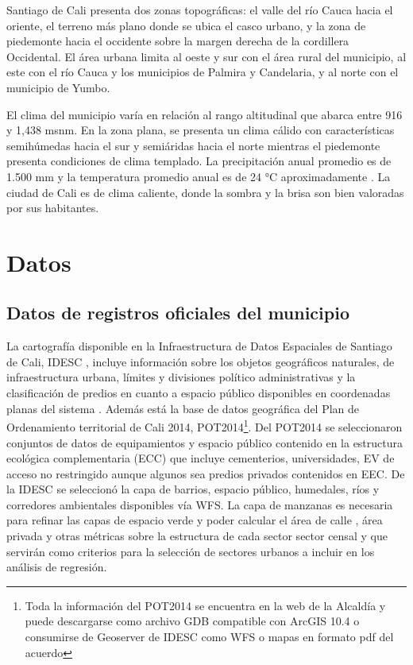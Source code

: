\documentclass[12pt,]{book}
\let\rmarkdownfootnote\footnote%
\def\footnote{\protect\rmarkdownfootnote}
\begin{document}
Santiago de Cali presenta dos zonas topográficas: el valle del río Cauca
hacia el oriente, el terreno más plano donde se ubica el casco urbano, y
la zona de piedemonte hacia el occidente sobre la margen derecha de la
cordillera Occidental. El área urbana limita al oeste y sur con el área
rural del municipio, al este con el río Cauca y los municipios de
Palmira y Candelaria, y al norte con el municipio de Yumbo.

El clima del municipio varía en relación al rango altitudinal que abarca
entre 916 y 1,438 msnm. En la zona plana, se presenta un clima cálido
con características semihúmedas hacia el sur y semiáridas hacia el norte
mientras el piedemonte presenta condiciones de clima templado. La
precipitación anual promedio es de 1.500 mm y la temperatura promedio
anual es de 24 °C aproximadamente \citep{ciat_plan_2015}. La ciudad de
Cali es de clima caliente, donde la sombra y la brisa son bien valoradas
por sus habitantes.

\section{Datos}\label{datos}

\subsection{Datos de registros oficiales del
municipio}\label{datos-de-registros-oficiales-del-municipio}

La cartografía disponible en la Infraestructura de Datos Espaciales de
Santiago de Cali, IDESC \citep{geoportal_idesc}, incluye información
sobre los objetos geográficos naturales, de infraestructura urbana,
límites y divisiones político administrativas y la clasificación de
predios en cuanto a espacio público disponibles en coordenadas planas
del sistema \citep{noauthor_magna-sirgas-cali_nodate}. Además está la
base de datos geográfica del Plan de Ordenamiento territorial de Cali
2014, POT2014\footnote{Toda la información del POT2014 se encuentra en
  la web de la Alcaldía y puede descargarse como archivo GDB compatible
  con ArcGIS 10.4 o consumirse de Geoserver de IDESC como WFS o mapas en
  formato pdf del acuerdo}. Del POT2014 se seleccionaron conjuntos de
datos de equipamientos y espacio público contenido en la estructura
ecológica complementaria (ECC) que incluye cementerios, universidades,
EV de acceso no restringido aunque algunos sea predios privados
contenidos en EEC. De la IDESC se seleccionó la capa de barrios, espacio
público, humedales, ríos y corredores ambientales disponibles vía WFS.
La capa de manzanas es necesaria para refinar las capas de espacio verde
y poder calcular el área de calle , área privada y otras métricas sobre
la estructura de cada sector sector censal y que servirán como criterios
para la selección de sectores urbanos a incluir en los análisis de
regresión.
\end{document}
